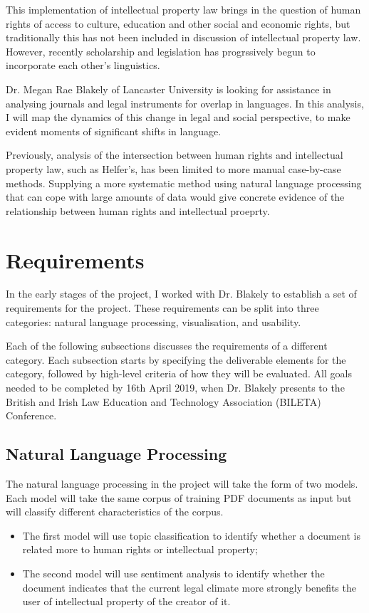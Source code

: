 		This implementation of intellectual property law brings in the question of human rights of access to culture, education and other social and economic rights, but traditionally this has not been included in discussion of intellectual property law\cite{mapping_ip_hr_helfer}. However, recently scholarship and legislation has progrssively begun to incorporate each other's linguistics\cite{bileta_proposal_blakely}.
			
		Dr. Megan Rae Blakely of Lancaster University is looking for assistance in analysing journals and legal instruments for overlap in languages. In this analysis, I will map the dynamics of this change in legal and social perspective, to make evident moments of significant shifts in language. 
			
		Previously, analysis of the intersection between human rights and intellectual property law, such as Helfer's\cite{hr_ip_conflict_coexistence_helfer}, has been limited to more manual case-by-case methods. Supplying a more systematic method using natural language processing that can cope with large amounts of data would give concrete evidence of the relationship between human rights and intellectual proeprty. 
	\section{Requirements}
		In the early stages of the project, I worked with Dr. Blakely to establish a set of requirements for the project. These requirements can be split into three categories: natural language processing, visualisation, and usability.  

		Each of the following subsections discusses the requirements of a different category. Each subsection starts by specifying the deliverable elements for the category, followed by high-level criteria of how they will be evaluated. All goals needed to be completed by 16th April 2019, when Dr. Blakely presents to the British and Irish Law Education and Technology Association (BILETA) Conference. 
		\subsection{Natural Language Processing}
			The natural language processing in the project will take the form of two models. Each model will take the same corpus of training PDF documents as input but will classify different characteristics of the corpus.
			
			\begin{itemize}
				\item The first model will use topic classification to identify whether a document is related more to human rights or intellectual property;
				\item The second model will use sentiment analysis to identify whether the document indicates that the current legal climate more strongly benefits the user of intellectual property of the creator of it.
			\end{itemize}
			
